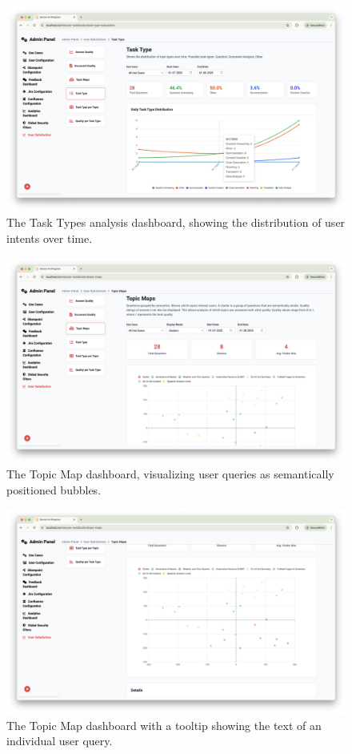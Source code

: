 \documentclass[
	english,
	ruledheaders=section,%
	class=report,%
	thesis={type=bachelor},%
	accentcolor=1b,%
	custommargins=true,%
	marginpar=false,%
	parskip=half-,%
	fontsize=11pt,%
	DIV=14,
]{tudapub}
\begin{document}
\begin{figure}[h!]
    \centering
    \includegraphics[width=0.75\linewidth]{images/TaskTypes.png}
    \caption{The Task Types analysis dashboard, showing the distribution of user intents over time.}
    \label{fig:task_types}
\end{figure}

\begin{figure}[h!]
    \centering
    \includegraphics[width=0.75\linewidth]{images/TopicMaps1.png}
    \caption{The Topic Map dashboard, visualizing user queries as semantically positioned bubbles.}
    \label{fig:topic_maps_main}
\end{figure}

\begin{figure}[h!]
    \centering
    \includegraphics[width=0.75\linewidth]{images/TopicMaps2.png}
    \caption{The Topic Map dashboard with a tooltip showing the text of an individual user query.}
    \label{fig:topic_maps_tooltip}
\end{figure}
\end{document}
